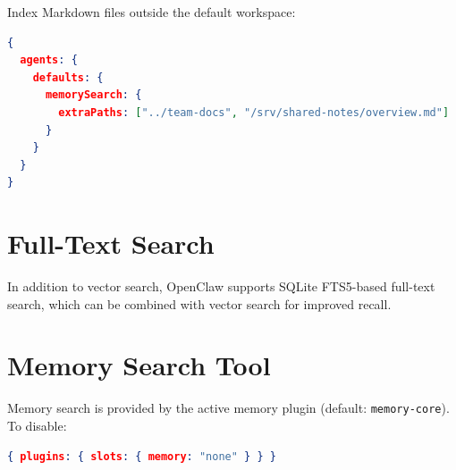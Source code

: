 Index Markdown files outside the default workspace:

\begin{lstlisting}[language=json]
{
  agents: {
    defaults: {
      memorySearch: {
        extraPaths: ["../team-docs", "/srv/shared-notes/overview.md"]
      }
    }
  }
}
\end{lstlisting}

\section{Full-Text Search}

In addition to vector search, OpenClaw supports SQLite FTS5-based full-text search, which can be combined with vector search for improved recall.

\section{Memory Search Tool}

Memory search is provided by the active memory plugin (default: \texttt{memory-core}). To disable:

\begin{lstlisting}[language=json]
{ plugins: { slots: { memory: "none" } } }
\end{lstlisting}
